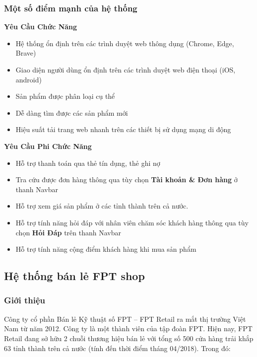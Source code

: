 \subsubsection{Một số điểm mạnh của hệ thống}
\textbf{Yêu Cầu Chức Năng}
\begin{itemize}
    \item Hệ thống ổn định trên các trình duyệt web thông dụng (Chrome, Edge, Brave)
    \item Giao diện người dùng ổn định trên các trình duyệt web điện thoại (iOS, android)
    \item Sản phẩm được phân loại cụ thể
    \item Dễ dàng tìm được các sản phẩm mới
    \item Hiệu suất tải trang web nhanh trên các thiết bị sử dụng mạng di động
\end{itemize}
\textbf{Yêu Cầu Phi Chức Năng}
\begin{itemize}
    \item Hỗ trợ thanh toán qua thẻ tín dụng, thẻ ghi nợ
    \item Tra cứu được đơn hàng thông qua tùy chọn \textbf{Tài khoản \& Đơn hàng} ở thanh Navbar
    \item Hỗ trợ xem giá sản phẩm ở các tỉnh thành trên cả nước.
    \item Hỗ trợ tính năng hỏi đáp với nhân viên chăm sóc khách hàng thông qua tùy chọn \textbf{Hỏi Đáp} trên thanh Navbar
    \item Hỗ trợ tính năng cộng điểm khách hàng khi mua sản phẩm
\end{itemize}

\subsection{Hệ thống bán lẻ FPT shop}
\subsubsection{Giới thiệu}
Công ty cổ phần Bán lẻ Kỹ thuật số FPT – FPT Retail ra mắt thị trường Việt Nam từ năm 2012. Công ty là một thành viên của tập đoàn FPT. Hiện nay, FPT Retail đang sở hữu 2 chuỗi thương hiệu bán lẻ với tổng số 500 cửa hàng trải khắp 63 tỉnh thành trên cả nước (tính đến thời điểm tháng 04/2018). Trong đó:

